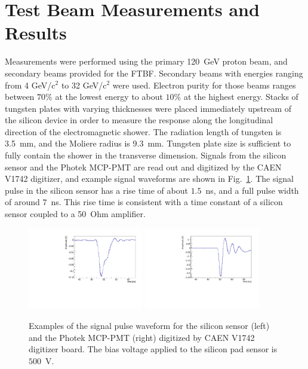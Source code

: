 \documentclass[12pt]{article}
\begin{document}
{\section{Test Beam Measurements and Results} 
\label{sec:results} 

Measurements were performed using the primary 120~GeV proton beam, and secondary
beams provided for the FTBF. Secondary beams with energies ranging from 4
GeV/c$^2$ to 32 GeV/c$^2$ were used. Electron purity for those beams ranges
between $70\%$ at the lowest energy to about $10\%$ at the highest energy.
Stacks of tungsten plates with varying thicknesses were placed immediately
upstream of the silicon device in order to measure the response along the
longitudinal direction of the electromagnetic shower. The radiation length of
tungsten is 3.5~mm, and the Moliere radius is 9.3~mm. Tungsten plate size is
sufficient to fully contain the shower in the transverse dimension. Signals from
the silicon sensor and the Photek MCP-PMT are read out and digitized by the CAEN
V1742 digitizer, and example signal waveforms are shown in
Fig.~\ref{fig:pulses}. The signal pulse in the silicon sensor has a rise time of
about $1.5$~ns, and a full pulse width of around $7$~ns. This rise time is
consistent with a time constant of a silicon sensor coupled to a 50~Ohm amplifier.

\begin{figure}[htbp] 
\centering
\includegraphics[width=0.45\textwidth]{plots/ExampleSiliconPadPulse_6X0_16GeV.pdf} 
\includegraphics[width=0.45\textwidth]{plots/ExamplePhotekPulse.pdf} 
\caption{Examples of the signal pulse waveform for the silicon sensor (left) and
the Photek MCP-PMT (right) digitized by CAEN V1742 digitizer board. The bias
voltage applied to the silicon pad sensor is~$500$~V.} 
\label{fig:pulses} 
\end{figure} 

}
\end{document}

